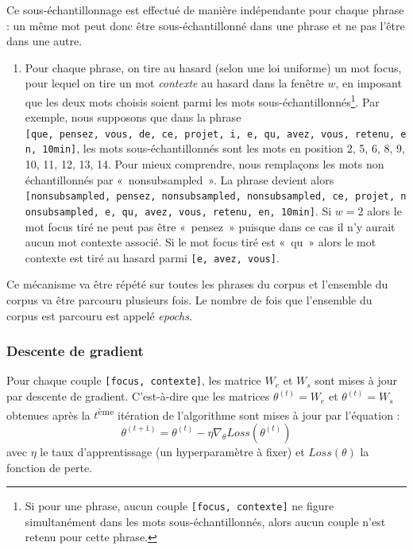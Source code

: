 \documentclass[11pt,french,french]{article}
\providecommand{\tightlist}{%
  \setlength{\parskip}{0pt}
  }
\let\rmarkdownfootnote\footnote%
\def\footnote{\protect\rmarkdownfootnote}
\begin{document}
Ce sous-échantillonnage est effectué de manière indépendante pour chaque phrase : un même mot peut donc être sous-échantillonné dans une phrase et ne pas l'être dans une autre.

\begin{enumerate}
\def\labelenumi{\arabic{enumi}.}
\setcounter{enumi}{1}
\tightlist
\item
  Pour chaque phrase, on tire au hasard (selon une loi uniforme) un mot focus, pour lequel on tire un mot \emph{contexte} au hasard dans la fenêtre \(w\), en imposant que les deux mots choisis soient parmi les mots sous-échantillonnés\footnote{Si pour une phrase, aucun couple \texttt{{[}focus,\ contexte{]}} ne figure simultanément dans les mots sous-échantillonnés, alors aucun couple n'est retenu pour cette phrase.}.
  Par exemple, nous supposons que dans la phrase \texttt{{[}que,\ pensez,\ vous,\ de,\ ce,\ projet,\ i,\ e,\ qu,\ avez,\ vous,\ retenu,\ en,\ 10min{]}}, les mots sous-échantillonnés sont les mots en position 2, 5, 6, 8, 9, 10, 11, 12, 13, 14.
  Pour mieux comprendre, nous remplaçons les mots non échantillonnés par «~nonsubsampled~». La phrase devient alors \texttt{{[}nonsubsampled,\ pensez,\ nonsubsampled,\ nonsubsampled,\ ce,\ projet,\ nonsubsampled,\ e,\ qu,\ avez,\ vous,\ retenu,\ en,\ 10min{]}}.
  Si \(w=2\) alors le mot focus tiré ne peut pas être «~pensez~» puisque dans ce cas il n'y aurait aucun mot contexte associé. Si le mot focus tiré est «~qu~» alors le mot contexte est tiré au hasard parmi \texttt{{[}e,\ avez,\ vous{]}}.
\end{enumerate}

Ce mécanisme va être répété sur toutes les phrases du corpus et l'ensemble du corpus va être parcouru plusieurs fois. Le nombre de fois que l'ensemble du corpus est parcouru est appelé \emph{epochs}.

\hypertarget{subsec:descentedegradient}{%
\subsubsection{Descente de gradient}\label{subsec:descentedegradient}}

Pour chaque couple \texttt{{[}focus,\ contexte{]}}, les matrice \(W_e\) et \(W_s\) sont mises à jour par descente de gradient.
C'est-à-dire que les matrices \(\theta^{(t)} = W_e\) et \(\theta^{(t)} = W_s\) obtenues après la \(t\)\textsuperscript{ème} itération de l'algorithme sont mises à jour par l'équation :
\[
\theta^{(t+1)} = \theta^{(t)} - \eta \nabla_\theta Loss(\theta^{(t)})
\]
avec \(\eta\) le taux d'apprentissage (un hyperparamètre à fixer) et \(Loss(\theta)\) la fonction de perte.
\end{document}
